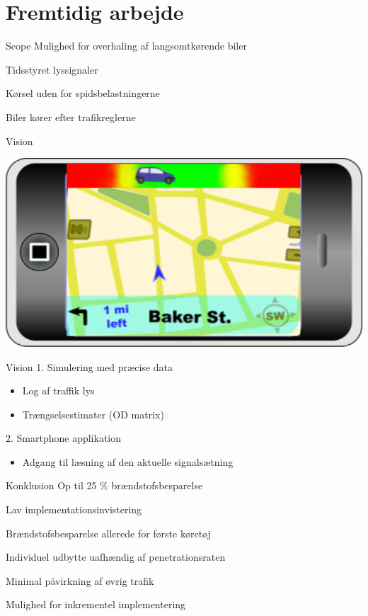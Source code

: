 \section{Fremtidig arbejde}
\begin{frame}{Scope}
Mulighed for overhaling af langsomtkørende biler
\vspace{4mm}

Tidsstyret lyssignaler
\vspace{4mm}

Kørsel uden for spidsbelastningerne
\vspace{4mm}

Biler kører efter trafikreglerne

\end{frame}

\begin{frame}{Vision}
\begin{center}
\includegraphics[width=1\textwidth]{images/product.png}
\end{center}
\end{frame}

\begin{frame}{Vision}
1. Simulering med præcise data
	\begin{itemize}
	\item Log af traffik lys
	\item Trængselsestimater (OD matrix)
	\end{itemize}

2. Smartphone applikation
	\begin{itemize}
	\item Adgang til læsning af den aktuelle signalsætning
	\end{itemize}

\end{frame}

\begin{frame}{Konklusion}
Op til 25 \% brændstofsbesparelse
\vspace{4mm}

Lav implementationsinvistering
\vspace{4mm}

Brændstofsbesparelse allerede for første køretøj
\vspace{4mm}

Individuel udbytte uafhændig af penetrationsraten
\vspace{4mm}

Minimal påvirkning af øvrig trafik
\vspace{4mm}

Mulighed for inkrementel implementering
\end{frame}
